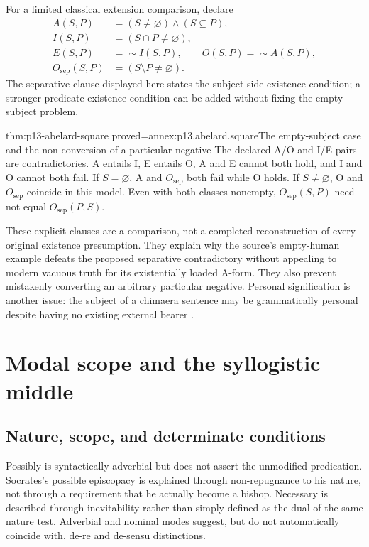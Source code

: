 For a limited classical extension comparison, declare
\[
 \begin{aligned}
 A(S,P)&=(S\ne\varnothing)\land(S\subseteq P),\\
 I(S,P)&=(S\cap P\ne\varnothing),\\
 E(S,P)&=\sim I(S,P),\qquad O(S,P)=\sim A(S,P),\\
 O_{\mathrm{sep}}(S,P)&=(S\setminus P\ne\varnothing).
 \end{aligned}
\]
The separative clause displayed here states the subject-side
existence condition; a stronger predicate-existence condition
can be added without fixing the empty-subject problem.

\begin{hblemma}{thm:p13-abelard-square}
 {proved=annex:p13.abelard.square}{The empty-subject case and the non-conversion of a particular negative}
The declared A/O and I/E pairs are contradictories.
A entails I, E entails O, A and E cannot both hold,
and I and O cannot both fail.
If \(S=\varnothing\), A and \(O_{\mathrm{sep}}\) both fail
while O holds. If \(S\ne\varnothing\), O and
\(O_{\mathrm{sep}}\) coincide in this model.
Even with both classes nonempty, \(O_{\mathrm{sep}}(S,P)\)
need not equal \(O_{\mathrm{sep}}(P,S)\).
\end{hblemma}

These explicit clauses are a comparison, not a completed reconstruction
of every original existence presumption.
They explain why the source's empty-human example defeats
the proposed separative contradictory without appealing to
modern vacuous truth for its existentially loaded A-form.
They also prevent mistakenly converting an arbitrary particular
negative. Personal signification is another issue: the subject
of a chimaera sentence may be grammatically personal despite
having no existing external bearer
\cite[pp.~108--110]{Wilks2007FordhamAbelard}.

\section{Modal scope and the syllogistic middle}
\label{sec:p13-abelard-modal}

\subsection{Nature, scope, and determinate conditions}

Possibly is syntactically adverbial but does not assert the
unmodified predication. Socrates's possible episcopacy is explained
through non-repugnance to his nature, not through a requirement
that he actually become a bishop.
Necessary is described through inevitability rather than simply
defined as the dual of the same nature test.
Adverbial and nominal modes suggest, but do not automatically
coincide with, de-re and de-sensu distinctions.

